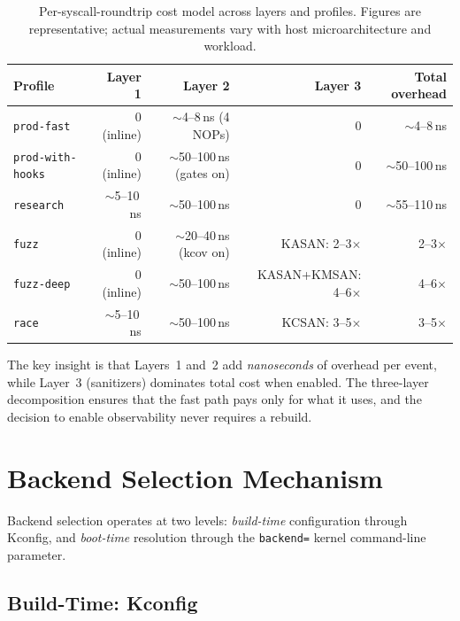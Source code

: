 \begin{table}[ht]
\centering
\caption{Per-syscall-roundtrip cost model across layers and profiles.
  Figures are representative; actual measurements vary with host
  microarchitecture and workload.}
\label{tab:cost-model}
\begin{tabular}{l r r r r}
\toprule
\textbf{Profile} & \textbf{Layer 1} & \textbf{Layer 2} & \textbf{Layer 3}
  & \textbf{Total overhead} \\
\midrule
\texttt{prod-fast}
  & 0 (inline)     & $\sim$4--8\,ns (4 NOPs)   & 0           & $\sim$4--8\,ns \\
\texttt{prod-with-hooks}
  & 0 (inline)     & $\sim$50--100\,ns (gates on) & 0         & $\sim$50--100\,ns \\
\texttt{research}
  & $\sim$5--10\,ns & $\sim$50--100\,ns        & 0           & $\sim$55--110\,ns \\
\texttt{fuzz}
  & 0 (inline)     & $\sim$20--40\,ns (kcov on) & KASAN: 2--3$\times$ & 2--3$\times$ \\
\texttt{fuzz-deep}
  & 0 (inline)     & $\sim$50--100\,ns          & KASAN+KMSAN: 4--6$\times$ & 4--6$\times$ \\
\texttt{race}
  & $\sim$5--10\,ns & $\sim$50--100\,ns        & KCSAN: 3--5$\times$ & 3--5$\times$ \\
\bottomrule
\end{tabular}
\end{table}

The key insight is that Layers~1 and~2 add \emph{nanoseconds} of overhead per
event, while Layer~3 (sanitizers) dominates total cost when enabled.  The
three-layer decomposition ensures that the fast path pays only for what it
uses, and the decision to enable observability never requires a rebuild.


\section{Backend Selection Mechanism}
\label{sec:backend-selection}

Backend selection operates at two levels: \emph{build-time} configuration
through Kconfig, and \emph{boot-time} resolution through the
\texttt{backend=} kernel command-line parameter.

\subsection{Build-Time: Kconfig}

